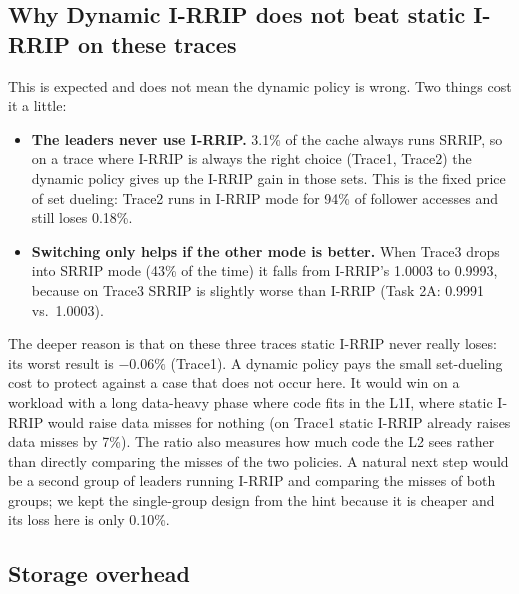 \documentclass[11pt]{article}
\begin{document}
\subsection{Why Dynamic I-RRIP does not beat static I-RRIP on these traces}
\label{sec:t2b-vs-static}
This is expected and does not mean the dynamic policy is wrong. Two things cost
it a little:
\begin{itemize}
  \item \textbf{The leaders never use I-RRIP.} 3.1\% of the cache always runs
        SRRIP, so on a trace where I-RRIP is always the right choice (Trace1,
        Trace2) the dynamic policy gives up the I-RRIP gain in those sets. This
        is the fixed price of set dueling: Trace2 runs in I-RRIP mode for 94\%
        of follower accesses and still loses 0.18\%.
  \item \textbf{Switching only helps if the other mode is better.} When Trace3
        drops into SRRIP mode (43\% of the time) it falls from I-RRIP's 1.0003 to
        0.9993, because on Trace3 SRRIP is slightly worse than I-RRIP (Task 2A:
        0.9991 vs.\ 1.0003).
\end{itemize}
The deeper reason is that on these three traces static I-RRIP never really
loses: its worst result is $-0.06\%$ (Trace1). A dynamic policy pays the small
set-dueling cost to protect against a case that does not occur here. It would
win on a workload with a long data-heavy phase where code fits in the L1I, where
static I-RRIP would raise data misses for nothing (on Trace1 static I-RRIP
already raises data misses by 7\%). The ratio also measures how much code the L2
sees rather than directly comparing the misses of the two policies. A natural
next step would be a second group of leaders running I-RRIP and comparing the
misses of both groups; we kept the single-group design from the hint because it
is cheaper and its loss here is only 0.10\%.

\subsection{Storage overhead}
\end{document}
